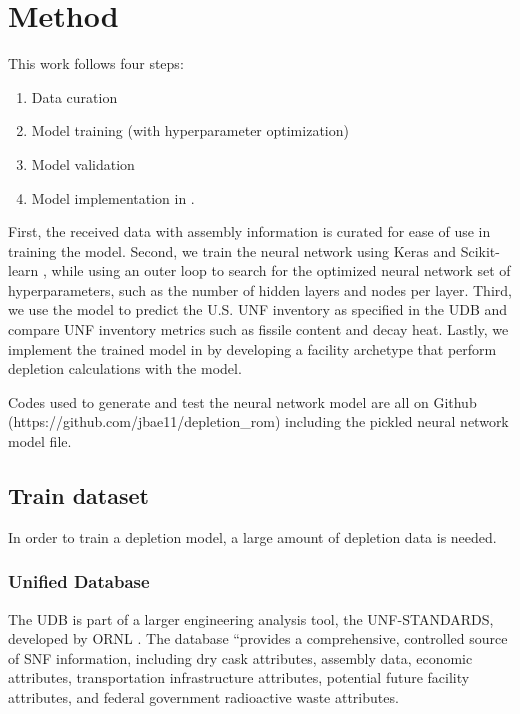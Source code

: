 \section{Method}

This work follows four steps:
\begin{enumerate}
\item Data curation
\item Model training (with hyperparameter optimization)
\item Model validation
\item Model implementation in \Cyclus.
\end{enumerate}
First, the
received data with assembly information is
curated for ease of use in training the model.
Second, we train the neural network using Keras \cite{collet_keras_2015}
and Scikit-learn \cite{pedregosa_scikit-learn_2011},
while using an outer loop to
search for the optimized neural network set of hyperparameters,
such as the number of hidden layers and nodes per layer.
Third, we use the model to predict the U.S. \gls{UNF}
inventory as specified in the \gls{UDB} and compare
\gls{UNF} inventory metrics such as fissile content
and decay heat. Lastly, we implement the trained
model in \Cyclus by developing a facility archetype
that perform depletion calculations with the model.

Codes used to generate and test the neural network
model are all on Github (https://github.com/jbae11/depletion\_rom)
including the pickled neural network model file.

\subsection{Train dataset}

In order to train a depletion model, a large amount of
depletion data is needed.

\subsubsection{Unified Database}
The \gls{UDB} is part of a larger engineering
analysis tool, the \gls{UNF-STANDARDS}, developed
by \gls{ORNL} \cite{peterson_used_2013}. The
database ``provides a comprehensive, controlled
source of \gls{SNF} information, including
dry cask attributes, assembly data, economic attributes,
transportation infrastructure attributes, potential future
facility attributes, and federal government radioactive
waste attributes.

